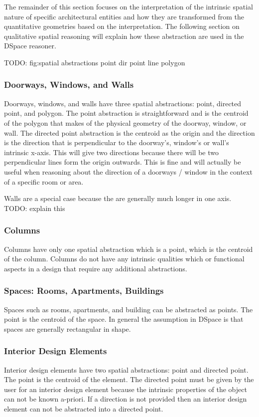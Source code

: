 \documentclass[12pt]{ucthesis}
\begin{document}
The remainder of this section focuses on the interpretation of the intrinsic spatial nature of specific architectural entities and how they are transformed from the quantitative geometries based on the interpretation. The following section on qualitative spatial reasoning will explain how these abstraction are used in the DSpace reasoner. 

TODO: fig:spatial abstractions point dir point line polygon 

\subsubsection{Doorways, Windows, and Walls}
Doorways, windows, and walls have three spatial abstractions: point, directed point, and polygon. The point abstraction is straightforward and is the centroid of the polygon that makes of the physical geometry of the doorway, window, or wall. The directed point abstraction is the centroid as the origin and the direction is the direction that is perpendicular to the doorway's, window's or wall's intrinsic x-axis. This will give two directions because there will be two perpendicular lines form the origin outwards. This is fine and will actually be useful when reasoning about the direction of a doorways / window in the context of a specific room or area. 

Walls are a special case because the are generally much longer in one axis. TODO: explain this

\subsubsection{Columns}
Columns have only one spatial abstraction which is a point, which is the centroid of the column. Columns do not have any intrinsic qualities which or functional aspects in a design that require any additional abstractions. 

\subsubsection{Spaces: Rooms, Apartments, Buildings}
Spaces such as rooms, apartments, and building can be abstracted as points. The point is the centroid of the space. In general the assumption in DSpace is that spaces are generally rectangular in shape.

\subsubsection{Interior Design Elements}
Interior design elements have two spatial abstractions: point and directed point. The point is the centroid of the element. The directed point must be given by the user for an interior design element because the intrinsic properties of the object can not be known a-priori. If a direction is not provided then an interior design element can not be abstracted into a directed point.
\end{document}
